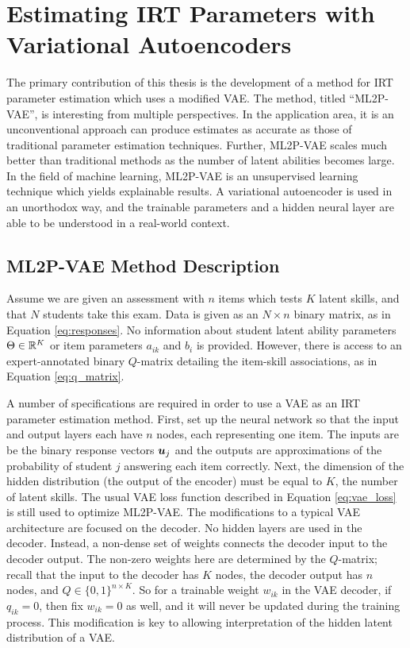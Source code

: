 \chapter{Estimating IRT Parameters with Variational Autoencoders}
The primary contribution of this thesis is the development of a method for IRT parameter estimation which uses a modified VAE. The method, titled ``ML2P-VAE'', is interesting from multiple perspectives. In the application area, it is an unconventional approach can produce estimates as accurate as those of traditional parameter estimation techniques. Further, ML2P-VAE scales much better than traditional methods as the number of latent abilities becomes large. In the field of machine learning, ML2P-VAE is an unsupervised learning technique which yields explainable results. A variational autoencoder is used in an unorthodox way, and the trainable parameters and a hidden neural layer are able to be understood in a real-world context.

\section{ML2P-VAE Method Description}\label{sec:ml2p_vae}
Assume we are given an assessment with $n$ items which tests $K$ latent skills, and that $N$ students take this exam. Data is given as an $N \times n$ binary matrix, as in Equation \ref{eq:responses}. No information about student latent ability parameters $\Theta \in \mathbb{R}^K$ or item parameters $a_{ik}$ and $b_i$ is provided. However, there is access to an expert-annotated binary $Q$-matrix detailing the item-skill associations, as in Equation \ref{eq:q_matrix}.


A number of specifications are required in order to use a VAE as an IRT parameter estimation method. First, set up the neural network so that the input and output layers each have $n$ nodes, each representing one item. The inputs are be the binary response vectors $\boldsymbol{u}_j$ and the outputs are approximations of the probability of student $j$ answering each item correctly. Next, the dimension of the hidden distribution (the output of the encoder) must be equal to $K$, the number of latent skills. The usual VAE loss function described in Equation \ref{eq:vae_loss} is still used to optimize ML2P-VAE.
The modifications to a typical VAE architecture are focused on the decoder. No hidden layers are used in the decoder. Instead, a non-dense set of weights connects the decoder input to the decoder output. The non-zero weights here are determined by the $Q$-matrix; recall that the input to the decoder has $K$ nodes, the decoder output has $n$ nodes, and $Q \in \{0,1\}^{n \times K}$. So for a trainable weight $w_{ik}$ in the VAE decoder, if $q_{ik}=0$, then fix $w_{ik}=0$ as well, and it will never be updated during the training process. This modification is key to allowing interpretation of the hidden latent distribution of a VAE.

